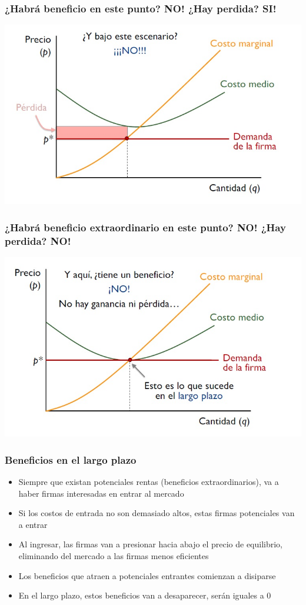 \documentclass{beamer}
\begin{document}
\begin{frame}
\frametitle{ ¿Habrá beneficio en este punto? NO! ¿Hay perdida? SI!}
\includegraphics[scale=0.55]{Figures/Tema_07.12_compperfecta6.jpg}
\end{frame}

\begin{frame}
\frametitle{ ¿Habrá beneficio extraordinario en este punto? NO! ¿Hay perdida? NO!}
\includegraphics[scale=0.55]{Figures/Tema_07.13_compperfecta7.jpg}
\end{frame}

\begin{frame}
\frametitle{ Beneficios en el largo plazo}
\begin{itemize}
    \item Siempre que existan potenciales rentas (beneficios extraordinarios), va a haber firmas interesadas en entrar al mercado
    \item Si los costos de entrada no son demasiado altos, estas firmas potenciales van a entrar
    \item Al ingresar, las firmas van a presionar hacia abajo el precio de equilibrio, eliminando del mercado a las firmas menos eficientes
    \item Los beneficios que atraen a potenciales entrantes comienzan a disiparse
    \item En el largo plazo, estos beneficios van a desaparecer, serán iguales a 0
    \end{itemize}
\end{frame}
\end{document}
